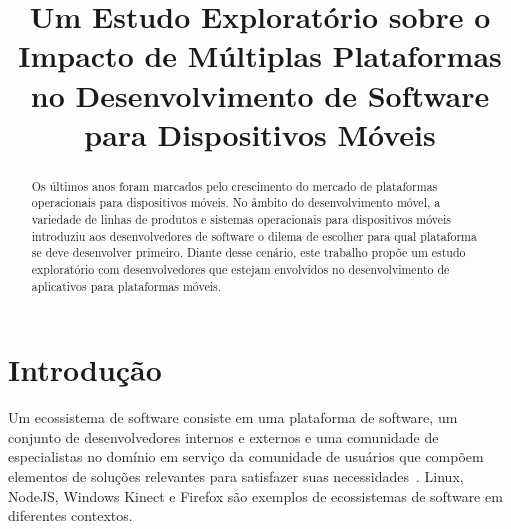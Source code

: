 \documentclass[conference]{IEEEtran}
\begin{document}
\title{Um Estudo Exploratório sobre o Impacto de Múltiplas Plataformas no Desenvolvimento de Software para Dispositivos Móveis}

\author{
}

\maketitle


\begin{abstract}
Os últimos anos foram marcados pelo crescimento do mercado de plataformas operacionais para dispositivos móveis. No âmbito do desenvolvimento móvel, a variedade de linhas de produtos e sistemas operacionais para dispositivos móveis introduziu aos desenvolvedores de software o dilema de escolher para qual plataforma se deve desenvolver primeiro. Diante desse cenário, este trabalho propõe um estudo exploratório com desenvolvedores que estejam envolvidos no desenvolvimento de aplicativos para plataformas móveis.
\end{abstract}

\IEEEpeerreviewmaketitle



\section{Introdução}

Um ecossistema de software consiste em uma plataforma de software, um conjunto de desenvolvedores internos e externos e uma comunidade de especialistas no domínio em serviço da comunidade de usuários que compõem elementos de soluções relevantes para satisfazer suas necessidades~\cite{Bosch201067}. Linux, NodeJS, Windows Kinect e Firefox são exemplos de ecossistemas de software em diferentes contextos. 
\end{document}
